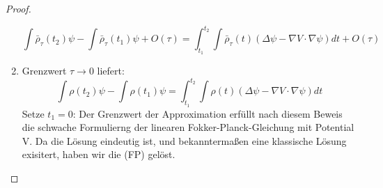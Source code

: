 \documentclass[11pt,a4paper,notitlepage]{scrreprt}
\begin{document}
\begin{proof}
\begin{enumerate}
\begin{equation}
\int\bar\rho_\tau(t_2)\psi-\int\bar\rho_\tau(t_1)\psi+O(\tau)=\int_{t_1}^{t_2}\int\bar\rho_\tau(t)(\Delta\psi-\nabla V\cdot\nabla\psi)dt+O(\tau)
\end{equation}
\item Grenzwert $\tau\to 0$ liefert:
\begin{equation}
\int\rho(t_2)\psi-\int\rho(t_1)\psi=\int_{t_1}^{t_2}\int\rho(t)(\Delta\psi-\nabla V\cdot\nabla\psi)dt
\end{equation}
Setze $t_1=0$: Der Grenzwert der Approximation erfüllt nach diesem Beweis die schwache Formulierng der linearen Fokker-Planck-Gleichung mit Potential V. Da die Lösung eindeutig ist, und bekanntermaßen eine klassische Lösung exisitert, haben wir die (FP) gelöst. 


\end{enumerate}
\end{proof}
\end{document}
